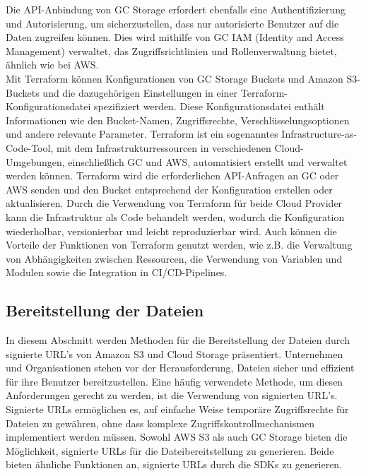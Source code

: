 Die API-Anbindung von GC Storage erfordert ebenfalls eine Authentifizierung und Autorisierung, um sicherzustellen, dass nur autorisierte Benutzer auf die Daten zugreifen können. Dies wird mithilfe von GC IAM (Identity and Access Management) verwaltet, das Zugriffsrichtlinien und Rollenverwaltung bietet, ähnlich wie bei AWS.\\

Mit Terraform können Konfigurationen von GC Storage Buckets und Amazon S3-Buckets und die dazugehörigen Einstellungen in einer Terraform-Konfigurationsdatei spezifiziert werden. Diese Konfigurationsdatei enthält Informationen wie den Bucket-Namen, Zugriffsrechte, Verschlüsselungsoptionen und andere relevante Parameter. Terraform ist ein sogenanntes Infrastructure-as-Code-Tool, mit dem Infrastrukturressourcen in verschiedenen Cloud-Umgebungen, einschließlich GC und AWS, automatisiert erstellt und verwaltet werden können. Terraform wird die erforderlichen API-Anfragen an GC oder AWS senden und den Bucket entsprechend der Konfiguration erstellen oder aktualisieren. Durch die Verwendung von Terraform für beide Cloud Provider kann die Infrastruktur als Code behandelt werden, wodurch die Konfiguration wiederholbar, versionierbar und leicht reproduzierbar wird. Auch können die Vorteile der Funktionen von Terraform genutzt werden, wie z.B. die Verwaltung von Abhängigkeiten zwischen Ressourcen, die Verwendung von Variablen und Modulen sowie die Integration in CI/CD-Pipelines.

\newpage

\subsection{Bereitstellung der Dateien}

In diesem Abschnitt werden Methoden für die Bereitstellung der Dateien durch signierte URL's von Amazon S3 und Cloud Storage präsentiert. Unternehmen und Organisationen stehen vor der Herausforderung, Dateien sicher und effizient für ihre Benutzer bereitzustellen. Eine häufig verwendete Methode, um diesen Anforderungen gerecht zu werden, ist die Verwendung von signierten URL's. Signierte URLs ermöglichen es, auf einfache Weise temporäre Zugriffsrechte für Dateien zu gewähren, ohne dass komplexe Zugriffskontrollmechanismen implementiert werden müssen. Sowohl AWS S3 als auch GC Storage bieten die Möglichkeit, signierte URLs für die Dateibereitstellung zu generieren. Beide bieten ähnliche Funktionen an, signierte URLs durch die SDKs zu generieren. \\

